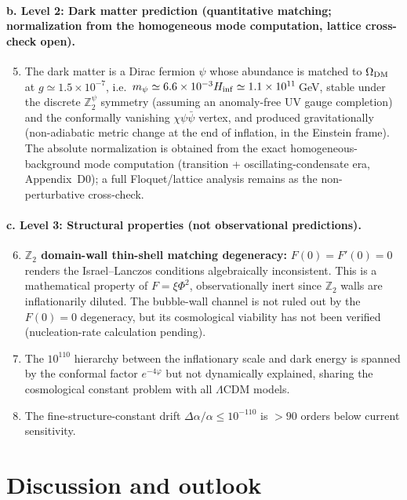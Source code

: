 \documentclass[pdflatex,sn-mathphys-num]{sn-jnl}
\newcommand{\Ztwo}{\mathbb{Z}_2}
\newcommand{\Ztwopsi}{\Ztwo^{\psi}}
\theoremstyle{thmstyleone}
\begin{document}
\paragraph{b. Level 2: Dark matter prediction (quantitative matching; normalization from the homogeneous mode computation, lattice cross-check open).}
\begin{enumerate}\setcounter{enumi}{4}
\item The dark matter is a Dirac fermion $\psi$ whose abundance is matched to $\Omega_{\rm DM}$ at $g\simeq1.5\times10^{-7}$, i.e.\ $m_\psi\simeq6.6\times10^{-3}H_{\rm inf}\simeq1.1\times10^{11}\,$GeV, stable under the discrete $\Ztwopsi$ symmetry (assuming an anomaly-free UV gauge completion) and the conformally vanishing $\chi\psi\bar\psi$ vertex, and produced gravitationally (non-adiabatic metric change at the end of inflation, in the Einstein frame). The absolute normalization is obtained from the exact homogeneous-background mode computation (transition + oscillating-condensate era, Appendix~D0); a full Floquet/lattice analysis remains as the non-perturbative cross-check.
\end{enumerate}

\paragraph{c. Level 3: Structural properties (not observational predictions).}
\begin{enumerate}\setcounter{enumi}{5}
\item \textbf{$\Ztwo$ domain-wall thin-shell matching degeneracy:} $F(0)=F'(0)=0$ renders the Israel--Lanczos conditions algebraically inconsistent. This is a mathematical property of $F=\xi\Phi^2$, observationally inert since $\Ztwo$ walls are inflationarily diluted. The bubble-wall channel is not ruled out by the $F(0)=0$ degeneracy, but its cosmological viability has not been verified (nucleation-rate calculation pending).
\item The $10^{110}$ hierarchy between the inflationary scale and dark energy is spanned by the conformal factor $e^{-4\varphi}$ but not dynamically explained, sharing the cosmological constant problem with all $\Lambda$CDM models.
\item The fine-structure-constant drift $\Delta\alpha/\alpha\leq10^{-110}$ is $>90$ orders below current sensitivity.
\end{enumerate}

\section{Discussion and outlook}
\end{document}
